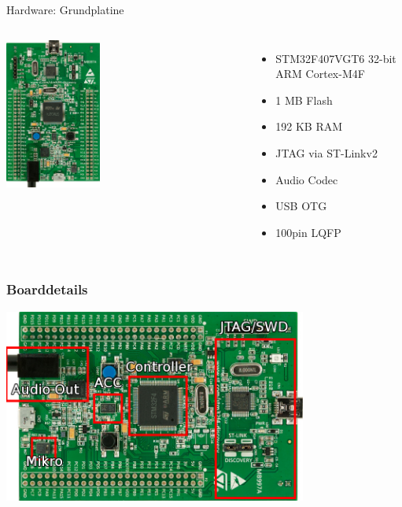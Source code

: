 \documentclass[ngerman,compress]{beamer}
\begin{document}
\begin{frame}{Hardware: Grundplatine}
	\begin{columns}
			\includegraphics[width=0.4\textwidth]{stm32f4_discovery.jpg}
			\begin{itemize}
			\item STM32F407VGT6 32-bit ARM Cortex-M4F
			\item 1 MB Flash 
			\item 192 KB RAM
			\item JTAG via ST-Linkv2
			\item Audio Codec
			\item USB OTG
			\item 100pin LQFP
			\end{itemize}
	\end{columns}
\end{frame}

\begin{frame}
	\frametitle{Boarddetails}
	\includegraphics[height=2.5in]{stm32f4_discovery_beschriftet.png}
\end{frame}
\end{document}
